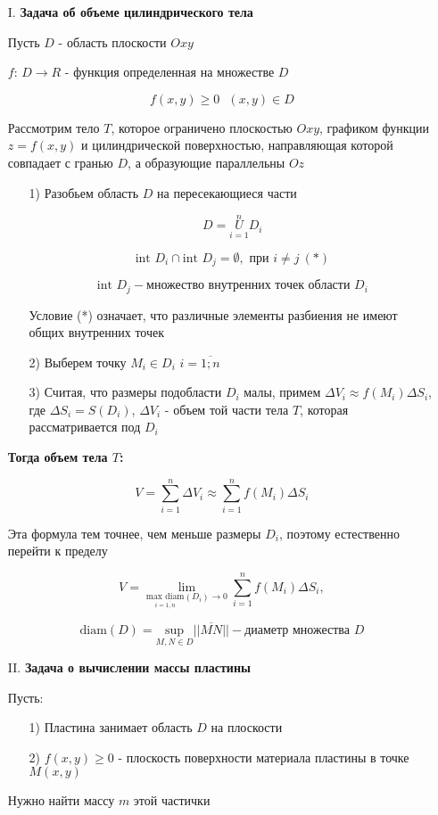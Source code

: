 \documentclass[a4paper, 14pt]{report}
\begin{document}
\begin{enumerate}
    \item[I.] \textbf{Задача об объеме цилиндрического тела}

    Пусть $D$ - область плоскости $Oxy$

    $f$: $D \to R$ - функция определенная на множестве $D$

    $$f(x, y) \geq 0\ \ \ (x, y) \in D$$

    Рассмотрим тело $T$, которое ограничено плоскостью $Oxy$, графиком функции $z = f(x,y)$ и цилиндрической поверхностью, направляющая которой совпадает с гранью $D$, а образующие параллельны $Oz$

        \begin{enumerate}
        \item[1)] Разобьем область $D$ на пересекающиеся части

        $$ D = \overset{n}{\underset{i = 1}{U}} D_i $$

        $$ \text{int } D_i \cap \text{int } D_j = \emptyset, \text{ при } i \ne j\ (*)$$

        $$ \text{int } D_j - \text{множество внутренних точек области } D_i $$

        Условие (*) означает, что различные элементы разбиения не имеют общих внутренних точек
        
        \item[2)] Выберем точку $M_i \in D_i$ $i = \overline{1;n}$
        
        \item[3)] Считая, что размеры подобласти $D_i$ малы, примем $\Delta V_i \approx f(M_i) \Delta S_i$, где $\Delta S_i = S(D_i)$, $\Delta V_i$ - объем той части тела $T$, которая рассматривается под $D_i$
        \end{enumerate}
        
    \textbf{Тогда объем тела $T$:}
    
    $$ V = \sum_{i=1}^n \Delta V_i \approx \sum_{i=1}^n f(M_i) \Delta S_i $$
    
    Эта формула тем точнее, чем меньше размеры $D_i$, поэтому естественно перейти к пределу
    
    $$ V = \lim_{\underset{i = \overline{1,n}}{\text{max diam}}(D_i) \to 0} \sum_{i=1}^n f(M_i) \Delta S_i,$$
    
    $$\text{diam} (D) = \underset{M,N \in D}{\text{sup}} || \overline{MN} || - \text{диаметр множества } D$$
    
    \item[II.] \textbf{Задача о вычислении массы пластины}
    
    Пусть: 
    
    \begin{enumerate}
        \item[1)] Пластина занимает область $D$ на плоскости
        \item[2)] $f(x,y) \geq 0$ - плоскость поверхности материала пластины в точке $M(x,y)$
    \end{enumerate}
    
    Нужно найти массу $m$ этой частички
\end{enumerate}
\end{document}

